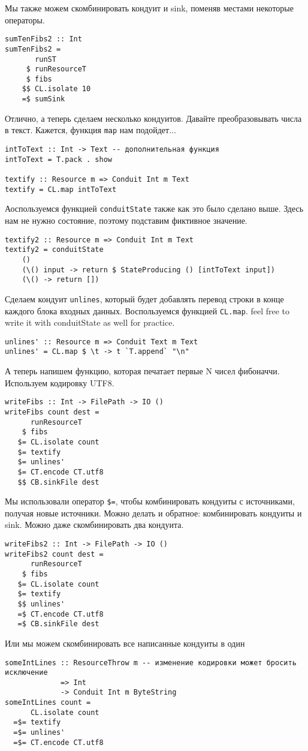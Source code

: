 Мы также можем скомбинировать кондуит и sink, поменяв местами некоторые операторы.
\begin{lstlisting}sumTenFibs2 :: Int
sumTenFibs2 =
       runST
     $ runResourceT
     $ fibs
    $$ CL.isolate 10
    =$ sumSink
\end{lstlisting}
Отлично, а теперь сделаем несколько кондуитов. Давайте преобразовывать числа в текст.
Кажется, функция \lstinline=map= нам подойдет...
\begin{lstlisting}
intToText :: Int -> Text -- дополнительная функция 
intToText = T.pack . show

textify :: Resource m => Conduit Int m Text
textify = CL.map intToText
\end{lstlisting}
Аоспользуемся функцией \lstinline=conduitState= также как это было сделано выше. Здесь
нам не нужно
состояние, поэтому подставим фиктивное значение.
\begin{lstlisting}
textify2 :: Resource m => Conduit Int m Text
textify2 = conduitState
    ()
    (\() input -> return $ StateProducing () [intToText input])
    (\() -> return [])
\end{lstlisting}
Сделаем кондуит \lstinline=unlines=, который будет добавлять перевод строки в конце каждого блока
входных данных. Воспользуемся функцией \lstinline=CL.map=. feel free to write it with
conduitState as
well for practice.
\begin{lstlisting}
unlines' :: Resource m => Conduit Text m Text
unlines' = CL.map $ \t -> t `T.append` "\n"
\end{lstlisting}
А теперь напишем функцию, которая печатает первые N чисел фибоначчи. Используем
кодировку UTF8.
\begin{lstlisting}
writeFibs :: Int -> FilePath -> IO ()
writeFibs count dest =
      runResourceT
    $ fibs
   $= CL.isolate count
   $= textify
   $= unlines'
   $= CT.encode CT.utf8
   $$ CB.sinkFile dest
\end{lstlisting}
Мы использовали оператор \lstinline'$=', чтобы комбинировать кондуиты с источниками,
получая
новые источники. Можно делать и обратное: комбинировать кондуиты и sink. Можно даже
скомбинировать два кондуита.
\begin{lstlisting}
writeFibs2 :: Int -> FilePath -> IO ()
writeFibs2 count dest =
      runResourceT
    $ fibs
   $= CL.isolate count
   $= textify
   $$ unlines'
   =$ CT.encode CT.utf8
   =$ CB.sinkFile dest
\end{lstlisting}
Или мы можем скомбинировать все написанные кондуиты в один
\begin{lstlisting}
someIntLines :: ResourceThrow m -- изменение кодировки может бросить исключение
             => Int
             -> Conduit Int m ByteString
someIntLines count =
      CL.isolate count
  =$= textify
  =$= unlines'
  =$= CT.encode CT.utf8
\end{lstlisting}
